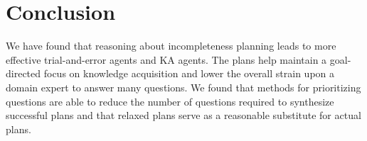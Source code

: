 \documentclass{article}
\begin{document}
% 
% 
% 
% 
% 


\section{Conclusion}

We have found that reasoning about incompleteness planning 
leads to more effective trial-and-error agents and KA agents.  The plans help maintain a
goal-directed focus on knowledge acquisition and lower the overall strain upon a
domain expert to answer many questions.  We found that methods for prioritizing
questions are able to reduce the number of questions required to synthesize
successful plans and that relaxed plans  serve as a reasonable substitute for
actual plans.  

\footnotesize
\renewcommand{\baselinestretch}{.75}


\end{document}
